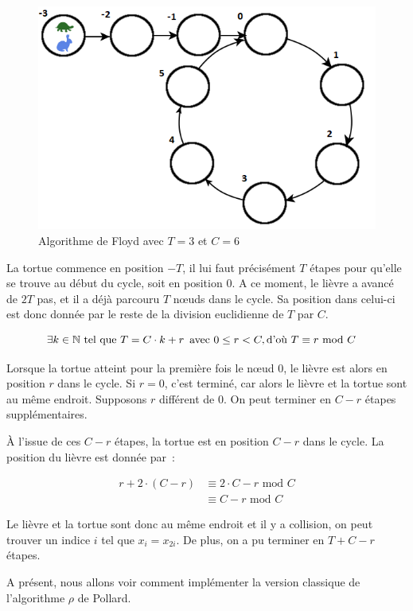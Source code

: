        \begin{figure}
          \center{}
          \includegraphics[scale=0.5]{images/Floyd.png}
          \caption{Algorithme de Floyd avec $T=3$ et $C=6$}
        \end{figure}

        La tortue commence en position $-T$, il lui faut précisément $T$ étapes pour qu'elle se trouve au début du cycle, soit en position $0$. A ce moment, le lièvre a avancé de $2 T$ pas, et il a déjà parcouru $T$ nœuds dans le cycle. Sa position dans celui-ci est donc donnée par le reste de la division euclidienne de $T$ par $C$.

        \begin{align*}
          \exists k \in \mathbb{N} \text{\ tel que } T = C \cdot k + r \text{\, avec } 0 \leq r < C, \text{d'où } T &\equiv r \text{\ mod } C
        \end{align*}

        Lorsque la tortue atteint pour la première fois le nœud $0$, le lièvre est alors en position $r$ dans le cycle. Si $r=0$, c'est terminé, car alors le lièvre et la tortue sont au même endroit. Supposons $r$ différent de $0$. On peut terminer en $C-r$ étapes supplémentaires.

        À l'issue de ces $C-r$ étapes, la tortue est en position $C-r$ dans le cycle. La position du lièvre est donnée par~:

        \begin{align*}
          r + 2 \cdot (C - r) &\equiv 2 \cdot C -r \text{\ mod } C \\
                              &\equiv C - r \text{\ mod } C
        \end{align*}

        Le lièvre et la tortue sont donc au même endroit et il y a collision, on peut trouver un indice $i$ tel que $x_i = x_{2i}$. De plus, on a pu terminer en $T + C - r$ étapes.

        A présent, nous allons voir comment implémenter la version classique de l'algorithme $\rho$ de Pollard.
